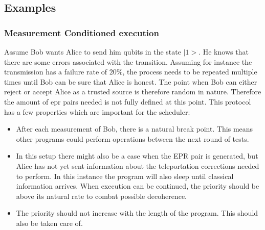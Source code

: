 \documentclass[]{article}
\begin{document}
\subsection{Examples}
\subsubsection{Measurement Conditioned execution}
Assume Bob wants Alice to send him qubits in the state $|1>$. He knows that there are some errors associated with the transition. Assuming for instance the transmission has a failure rate of $20\%$, the process needs to be repeated multiple times until Bob can be sure that Alice is honest. The point when Bob can either reject or accept Alice as a trusted source is therefore random in nature. Therefore the amount of epr pairs needed is not fully defined at this point. This protocol has a few properties which are important for the scheduler:\\
\begin{itemize}
	\item After each measurement of Bob, there is a natural break point. This means other programs could perform operations between the next round of tests.
	\item In this setup there might also be a case when the EPR pair is generated, but Alice has not yet sent information about the teleportation corrections needed to perform. In this instance the program will also sleep until classical information arrives. When execution can be continued, the priority should be above its natural rate to combat possible decoherence. 
	\item The priority should not increase with the length of the program. This should also be taken care of.
\end{itemize}
\end{document}

